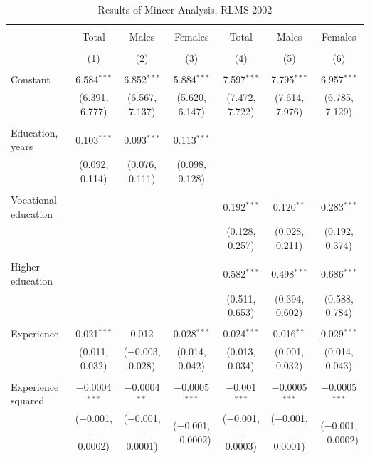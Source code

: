 \documentclass[12pt,a4paper]{article}
\numberwithin{equation}{section}
\begin{document}
\begin{landscape}
	
	\fontsize{9}{11}
	\selectfont
	
	\begin{table}[!htbp] \centering 
		\caption{Results of Mincer Analysis, RLMS 2002} 
		\label{} 
		\begin{tabular}{@{\extracolsep{5pt}}lcccccc} 
			\\[-1.8ex]\hline 
			\hline \\[-1.8ex] 
			& Total & Males & Females & Total & Males & Females \\ 
			\\[-1.8ex] & (1) & (2) & (3) & (4) & (5) & (6)\\ 
			\hline \\[-1.8ex] 
			Constant & 6.584$^{***}$ & 6.852$^{***}$ & 5.884$^{***}$ & 7.597$^{***}$ & 7.795$^{***}$ & 6.957$^{***}$ \\ 
			& (6.391, 6.777) & (6.567, 7.137) & (5.620, 6.147) & (7.472, 7.722) & (7.614, 7.976) & (6.785, 7.129) \\ 
			& & & & & & \\ 
			Education, years & 0.103$^{***}$ & 0.093$^{***}$ & 0.113$^{***}$ &  &  &  \\ 
			& (0.092, 0.114) & (0.076, 0.111) & (0.098, 0.128) &  &  &  \\ 
			& & & & & & \\ 
			Vocational education &  &  &  & 0.192$^{***}$ & 0.120$^{**}$ & 0.283$^{***}$ \\ 
			&  &  &  & (0.128, 0.257) & (0.028, 0.211) & (0.192, 0.374) \\ 
			& & & & & & \\ 
			Higher education &  &  &  & 0.582$^{***}$ & 0.498$^{***}$ & 0.686$^{***}$ \\ 
			&  &  &  & (0.511, 0.653) & (0.394, 0.602) & (0.588, 0.784) \\ 
			& & & & & & \\ 
			Experience & 0.021$^{***}$ & 0.012 & 0.028$^{***}$ & 0.024$^{***}$ & 0.016$^{**}$ & 0.029$^{***}$ \\ 
			& (0.011, 0.032) & ($-$0.003, 0.028) & (0.014, 0.042) & (0.013, 0.034) & (0.001, 0.032) & (0.014, 0.043) \\ 
			& & & & & & \\ 
			Experience squared & $-$0.0004$^{***}$ & $-$0.0004$^{**}$ & $-$0.0005$^{***}$ & $-$0.001$^{***}$ & $-$0.0005$^{***}$ & $-$0.0005$^{***}$ \\ 
			& ($-$0.001, $-$0.0002) & ($-$0.001, $-$0.0001) & ($-$0.001, $-$0.0002) & ($-$0.001, $-$0.0003) & ($-$0.001, $-$0.0001) & ($-$0.001, $-$0.0002) \\ 

\end{tabular}
\end{table}
\end{landscape}
\end{document}
